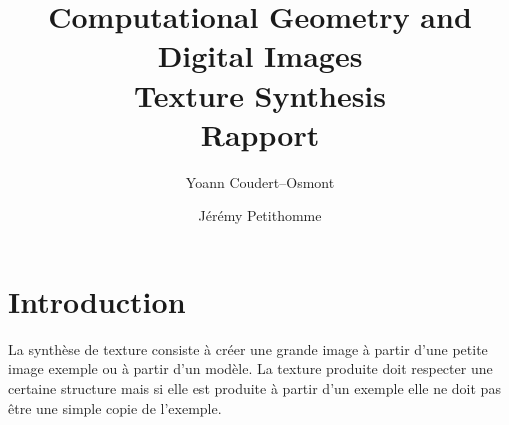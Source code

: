 \documentclass[12pt]{article}
\title{
	Computational Geometry and Digital Images\\
	\textbf{Texture Synthesis}\\
	Rapport
}
\author{
	Yoann Coudert--Osmont
	\and
	Jérémy Petithomme
}
\begin{document}
	
\maketitle

\section{Introduction}
	
La synthèse de texture consiste à créer une grande image à partir d'une petite image exemple ou à partir d'un modèle. La texture produite doit respecter une certaine structure mais si elle est produite à partir d'un exemple elle ne doit pas être une simple copie de l'exemple.
\end{document}
